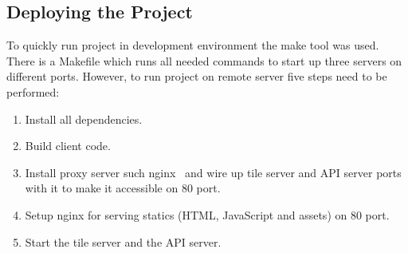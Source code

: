 \subsection{Deploying the Project}

To quickly run project in development environment the make tool was used. There is a Makefile
which runs all needed commands to start up three servers on different ports. However,
to run project on remote server five steps need to be performed:

\begin{enumerate}
  \item Install all dependencies.
  \item Build client code.
  \item Install proxy server such nginx~\cite{nginx} and wire up tile server and API server ports
    with it to make it accessible on 80 port.
  \item Setup nginx for serving statics (HTML, JavaScript and assets) on 80 port.
  \item Start the tile server and the API server.
\end{enumerate}
